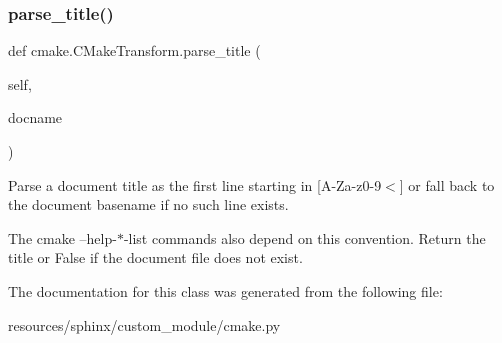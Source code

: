\subsubsection{\texorpdfstring{parse\+\_\+title()}{parse\_title()}}
{\footnotesize\ttfamily def cmake.\+C\+Make\+Transform.\+parse\+\_\+title (\begin{DoxyParamCaption}\item[{}]{self,  }\item[{}]{docname }\end{DoxyParamCaption})}



Parse a document title as the first line starting in \mbox{[}A-\/\+Za-\/z0-\/9$<$\mbox{]} or fall back to the document basename if no such line exists. 

The cmake --help-\/$\ast$-\/list commands also depend on this convention. Return the title or False if the document file does not exist. 

The documentation for this class was generated from the following file\+:\begin{DoxyCompactItemize}
\item 
resources/sphinx/custom\+\_\+module/cmake.\+py\end{DoxyCompactItemize}
